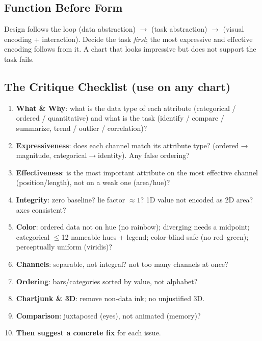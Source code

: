 \subsection{Function Before Form}

\begin{keybox}
Design follows the loop  (data abstraction) $\to$  (task
abstraction) $\to$  (visual encoding + interaction). Decide the task
\emph{first}; the most expressive and effective encoding follows from it. A
chart that looks impressive but does not support the task fails.
\end{keybox}

\subsection{The Critique Checklist (use on any chart)}

\begin{exambox}
\begin{enumerate}
  \item \textbf{What \& Why}: what is the data type of each attribute
    (categorical / ordered / quantitative) and what is the task
    (identify / compare / summarize, trend / outlier / correlation)?
  \item \textbf{Expressiveness}: does each channel match its attribute type?
    (ordered$\to$magnitude, categorical$\to$identity). Any false ordering?
  \item \textbf{Effectiveness}: is the most important attribute on the most
    effective channel (position/length), not on a weak one (area/hue)?
  \item \textbf{Integrity}: zero baseline? lie factor $\approx 1$? 1D value not
    encoded as 2D area? axes consistent?
  \item \textbf{Color}: ordered data not on hue (no rainbow); diverging needs a
    midpoint; categorical $\le$12 nameable hues + legend; color-blind safe (no
    red--green); perceptually uniform (viridis)?
  \item \textbf{Channels}: separable, not integral? not too many channels at
    once?
  \item \textbf{Ordering}: bars/categories sorted by value, not alphabet?
  \item \textbf{Chartjunk \& 3D}: remove non-data ink; no unjustified 3D.
  \item \textbf{Comparison}: juxtaposed (eyes), not animated (memory)?
  \item \textbf{Then suggest a concrete fix} for each issue.
\end{enumerate}
\end{exambox}

